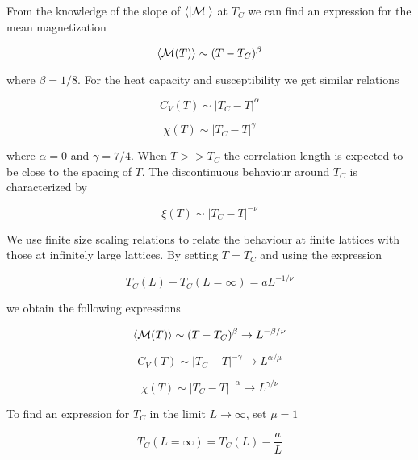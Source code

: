 \documentclass[11pt]{article}
\begin{document}
\begin{flushleft}
From the knowledge of the slope of $\braket{|\mathcal{M}|}$ at $T_C$ we can find an expression for the mean magnetization

\begin{equation}
\braket{\mathcal{M}(T)} \sim (T-T_C)^{\beta}
\end{equation}

where $\beta=1/8$. For the heat capacity and susceptibility we get similar relations

\begin{equation}
C_V(T) \sim |T_C - T|^{\alpha}
\end{equation}

\begin{equation}
\chi (T) \sim |T_C-T|^{\gamma}
\end{equation}

where $\alpha=0$ and $\gamma = 7/4$. When $T >>  T_C$ the correlation length is expected to be close to the spacing of $T$. The discontinuous behaviour around $T_C$ is characterized by

\begin{equation}
\xi(T) \sim |T_C -T|^{- \nu}
\end{equation}

We use finite size scaling relations to relate the behaviour at finite lattices with those at infinitely large lattices. By setting $T=T_C$ and using the expression

\begin{equation*}\label{eq. 3}
T_C(L) - T_C(L= \infty) = aL^{-1/\nu}
\end{equation*}

we obtain the following expressions

\begin{equation}
\braket{\mathcal{M}(T)} \sim (T-T_C)^{\beta} \rightarrow L^{-\beta/\nu}
\end{equation}

\begin{equation}
C_V(T) \sim |T_C-T|^{-\gamma} \rightarrow L^{\alpha/\mu}
\end{equation}

\begin{equation*}
\chi (T) \sim |T_C - T|^{- \alpha} \rightarrow L^{\gamma/\nu}
\end{equation*}

To find an expression for $T_C$ in the limit $L \rightarrow \infty$, set $\mu=1$

\begin{equation}\label{T at critical}
T_C(L = \infty ) = T_C(L) - \frac{a}{L}
\end{equation}


\end{flushleft}
\end{document}

